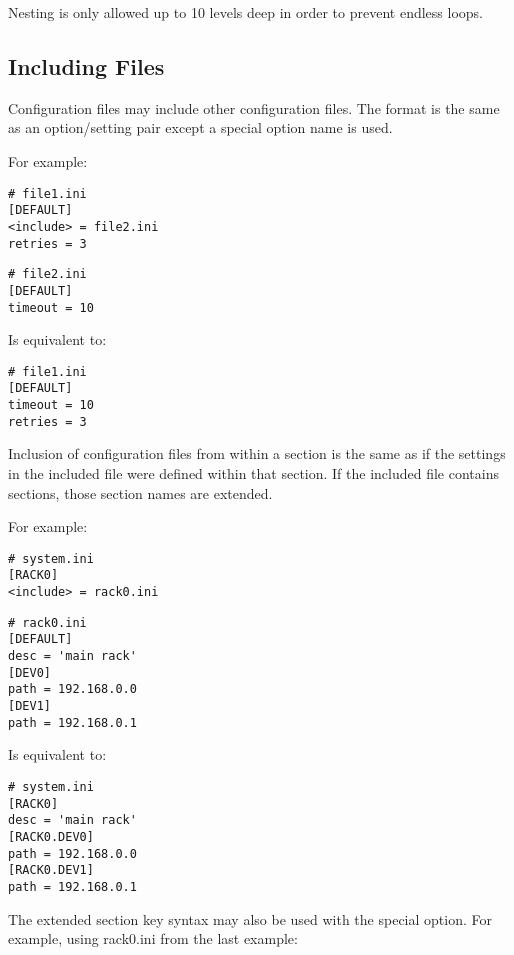 \documentclass{howto}
\begin{document}
Nesting is only allowed up to 10 levels deep in order to prevent endless 
loops.

\subsection{Including Files}

Configuration files may include other configuration files.  The format
is the same as an option/setting pair except a special  
option name is used.

For example:

\begin{verbatim}
# file1.ini
[DEFAULT]
<include> = file2.ini
retries = 3
\end{verbatim}

\begin{verbatim}
# file2.ini
[DEFAULT]
timeout = 10
\end{verbatim}

Is equivalent to:

\begin{verbatim}
# file1.ini
[DEFAULT]
timeout = 10
retries = 3
\end{verbatim}

Inclusion of configuration files from within a section is the same as if
the settings in the included file were defined within that section.  If the
included file contains sections, those section names are extended.

For example:

\begin{verbatim}
# system.ini
[RACK0]
<include> = rack0.ini
\end{verbatim}

\begin{verbatim}
# rack0.ini
[DEFAULT]
desc = 'main rack'
[DEV0]
path = 192.168.0.0
[DEV1]
path = 192.168.0.1
\end{verbatim}

Is equivalent to:

\begin{verbatim}
# system.ini
[RACK0]
desc = 'main rack'
[RACK0.DEV0]
path = 192.168.0.0
[RACK0.DEV1]
path = 192.168.0.1
\end{verbatim}

The extended section key syntax may also be used with the 
special option.  For example, using rack0.ini from the last example:
\end{document}
